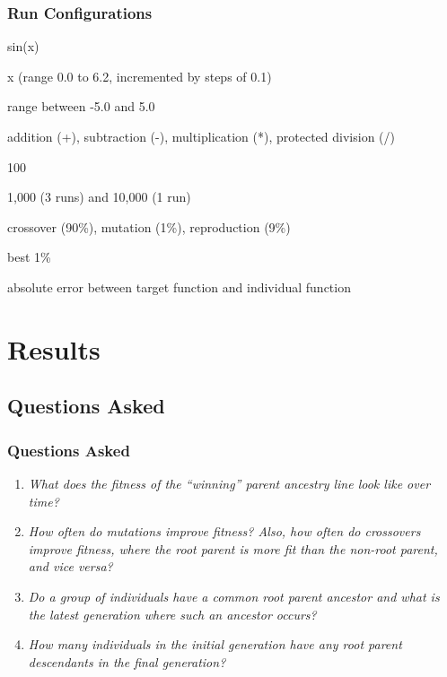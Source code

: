 \documentclass{beamer}
\begin{document}
\begin{frame}
\frametitle{Run Configurations}
\begin{description}[align=left, leftmargin=*]
{\small
\item[Target Function] sin(x)
\item[Variables] x (range 0.0 to 6.2, incremented by steps of 0.1)
\item[Constants] range between -5.0 and 5.0
\item[Operations] addition (+), subtraction (-), multiplication (*), protected division (/)
\item[Generation Number] 100
\item[Population Size Per Gen] 1,000 (3 runs) and 10,000 (1 run)
\item[Transform Percentages] crossover (90\%), mutation (1\%), reproduction (9\%)
\item[Elitism] best 1\%
\item[Fitness] absolute error between target function and individual function
}
\end{description}
\end{frame}

\section[Results]{Results}

\subsection[Questions Asked]{Questions Asked}

\begin{frame}
\frametitle{Questions Asked}
\begin{enumerate}
\item \emph{What does the fitness of the ``winning'' parent ancestry line look like over time?}
\item \emph{How often do mutations improve fitness? Also, how often do crossovers improve fitness, where the root parent is more fit than the non-root parent, and vice versa?}
\item \emph{Do a group of individuals have a common root parent ancestor and what is the latest generation where such an ancestor occurs?}
\item \emph{How many individuals in the initial generation have any root parent descendants in the final generation?}
\end{enumerate}
\end{frame}
\end{document}

